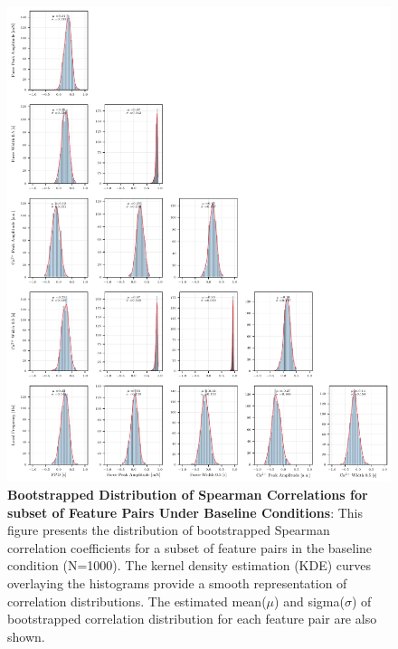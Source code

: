 \documentclass{report}
\begin{document}
     \begin{figure}[H]
        \centering
        \includegraphics[width=1.0\textwidth, keepaspectratio]{plots/chapter_7/correlation_grid_baseline_histogram_optional_features_6.pdf}
        \caption[Bootstrapped Distribution of Spearman Correlations for subset of Feature Pairs Under Baseline Conditions]{\textbf{Bootstrapped Distribution of Spearman Correlations for subset of Feature Pairs Under Baseline Conditions}:  
        This figure presents the distribution of bootstrapped Spearman correlation coefficients for a subset of feature pairs in the baseline condition (N=1000). The kernel density estimation (KDE) curves overlaying the histograms provide a smooth representation of correlation distributions. The estimated mean($\mu$) and sigma($\sigma$) of bootstrapped correlation distribution for each feature pair are also shown.}
        \label{fig:bootstrapped_spearman_correlation_subset_baseline_histogram}
    \end{figure}
    
\end{document}
